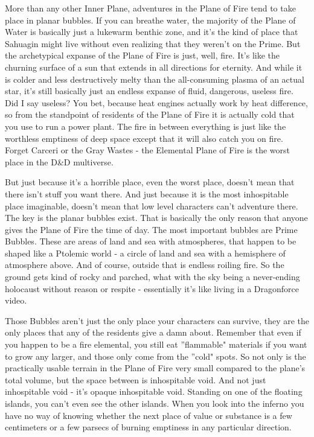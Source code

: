 More than any other Inner Plane, adventures in the Plane of Fire tend to take place in planar bubbles. If you can breathe water, the majority of the Plane of Water is basically just a lukewarm benthic zone, and it's the kind of place that Sahuagin might live without even realizing that they weren't on the Prime. But the archetypical expanse of the Plane of Fire is just, well, fire. It's like the churning surface of a sun that extends in all directions for eternity. And while it is colder and less destructively melty than the all-consuming plasma of an actual star, it's still basically just an endless expanse of fluid, dangerous, useless fire. Did I say useless? You bet, because heat engines actually work by heat difference, so from the standpoint of residents of the Plane of Fire it is actually cold that you use to run a power plant. The fire in between everything is just like the worthless emptiness of deep space except that it will also catch you on fire. Forget Carceri or the Gray Wastes - the Elemental Plane of Fire is the worst place in the D\&D multiverse.

But just because it's a horrible place, even the worst place, doesn't mean that there isn't stuff you want there. And just because it is the most inhospitable place imaginable, doesn't mean that low level characters can't adventure there. The key is the planar bubbles exist. That is basically the only reason that anyone gives the Plane of Fire the time of day. The most important bubbles are Prime Bubbles. These are areas of land and sea with atmospheres, that happen to be shaped like a Ptolemic world - a circle of land and sea with a hemisphere of atmosphere above. And of course, outside that is endless roiling fire. So the ground gets kind of rocky and parched, what with the sky being a never-ending holocaust without reason or respite - essentially it's like living in a Dragonforce video.

Those Bubbles aren't just the only place your characters can survive, they are the only places that any of the residents give a damn about. Remember that even if you happen to be a fire elemental, you still eat ''flammable" materials if you want to grow any larger, and those only come from the ''cold" spots. So not only is the practically usable terrain in the Plane of Fire very small compared to the plane's total volume, but the space between is inhospitable void. And not just inhospitable void - it's opaque inhospitable void. Standing on one of the floating islands, you can't even see the other islands. When you look into the inferno you have no way of knowing whether the next place of value or substance is a few centimeters or a few parsecs of burning emptiness in any particular direction.

